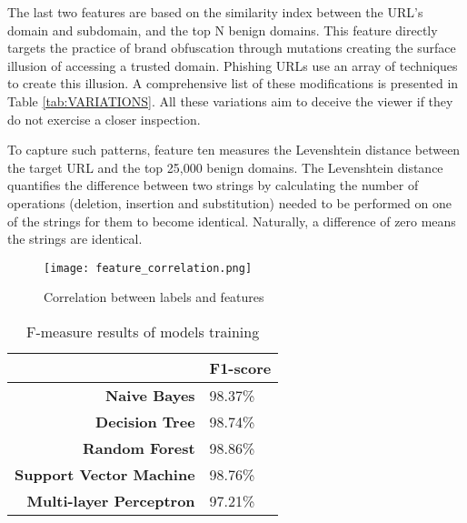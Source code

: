 The last two features are based on the similarity index between the URL's domain and subdomain, and the top N benign domains. This feature directly targets the practice of brand obfuscation through mutations creating the surface illusion of accessing a trusted domain.
Phishing URLs use an array of techniques to create this illusion. A comprehensive list of these modifications is presented in Table \ref{tab:VARIATIONS}. All these variations aim to deceive the viewer if they do not exercise a closer inspection.

To capture such patterns, feature ten measures the Levenshtein distance between the target URL and the top 25,000 benign domains. The Levenshtein distance quantifies the difference between two strings by calculating the number of operations (deletion, insertion and substitution) needed to be performed on one of the strings for them to become identical. Naturally, a difference of zero means the strings are identical.

\begin{figure}[!t]
	\centering
	\texttt{[image: feature\_correlation.png]}
	\caption{Correlation between labels and features}
	\label{fig:FEATURE_CORRELATION}
\end{figure}

\begin{singlespace}
	\begin{table}[b]
		\begin{center}
			\begin{tabular}{  m{13em}  m{10em}  } \toprule

				                                                    & \textbf{F1-score} \\ \midrule

				\multicolumn{1}{r}{\textbf{Naive Bayes}}            & 98.37\%           \\

				\multicolumn{1}{r}{\textbf{Decision Tree}}          & 98.74\%           \\

				\multicolumn{1}{r}{\textbf{Random Forest}}          & 98.86\%           \\

				\multicolumn{1}{r}{\textbf{Support Vector Machine}} & 98.76\%           \\

				\multicolumn{1}{r}{\textbf{Multi-layer Perceptron}} & 97.21\%           \\ \bottomrule
			\end{tabular}
			\caption{F-measure results of models training}
			\label{tab:FIRST_TRAINED_MODELS}
		\end{center}
	\end{table}
\end{singlespace}


